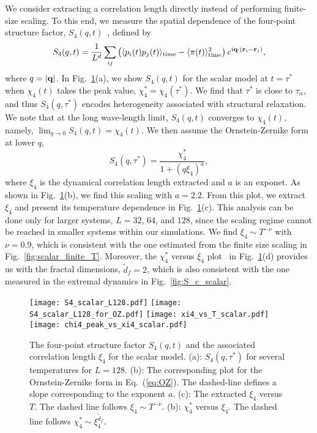\documentclass[pre,twocolumn,superscriptaddress,tightenlines,showpacs,longbibliography,floatfix,footinbib]{revtex4-1}
\begin{document}
We consider extracting a correlation length directly instead of performing finite-size scaling. 
To this end, we measure the spatial dependence of the four-point structure factor, $S_4(q, t)$~\cite{lavcevic2003spatially}, defined by
\begin{equation}
    S_4(q,t) = \frac{1}{L^d} \sum_{ij} \left( \langle p_i(t)p_j(t)\rangle_{\rm time} - \langle \pi(t) \rangle_{\rm time}^2 \right)e^{i{\bf q} \cdot ({\bf r}_i-{\bf r}_j)},
\end{equation}
where $q=|{\bf q}|$.
In Fig.~\ref{fig:S4}(a), we show $S_4(q,t)$ for the scalar model at $t=\tau^*$ when $\chi_4(t)$ takes the peak value, $\chi_4^*=\chi_4(\tau^*)$. We find that $\tau^*$ is close to $\tau_\alpha$, and thus $S_4(q,\tau^*)$ encodes heterogeneity associated with structural relaxation. 
We note that at the long wave-length limit, $S_4(q,t)$ converges to $\chi_4(t)$, namely, $\lim_{q \to 0} S_4(q,t) = \chi_4(t)$.
We then assume the Ornstein-Zernike
form at lower $q$, 
\begin{equation}
    S_4(q,\tau^*) = \frac{\chi_4^*}{1+(q\xi_4)^a},
    \label{eq:OZ}
\end{equation}
where $\xi_4$ is the dynamical correlation length extracted and $a$ is an exponet.
As shown in Fig.~\ref{fig:S4}(b), we find this scaling with $a=2.2$.
From this plot, we extract $\xi_4$ and present its temperature dependence in Fig.~\ref{fig:S4}(c).
This analysis can be done only for larger systems, $L=32$, $64$, and  $128$, since the scaling regime cannot be reached in smaller systems within our simulations.
We find $\xi_4 \sim T^{-\nu}$ with $\nu=0.9$, which is consistent with the one estimated from the finite size scaling in Fig.~\ref{fig:scalar_finite_T}. Moreover, the $\chi_4^*$ versus $\xi_4$ plot~\cite{flenner2014universal,kim2013multiple} in Fig.~\ref{fig:S4}(d) provides us with the fractal dimensions, $\tilde d_f=2$, which is also consistent with the one measured in the extremal dynamics in Fig.~\ref{fig:S_c_scalar}.


\begin{figure}
\centering
\texttt{[image: S4\_scalar\_L128.pdf]}
\texttt{[image: S4\_scalar\_L128\_for\_OZ.pdf]}
\texttt{[image: xi4\_vs\_T\_scalar.pdf]}
\texttt{[image: chi4\_peak\_vs\_xi4\_scalar.pdf]}
\caption{The four-point structure factor $S_4(q, t)$ and the associated correlation length $\xi_4$ for the scalar model.
(a): $S_4(q, \tau^*)$ for several temperatures for $L=128$. (b): The corresponding plot for the Ornstein-Zernike
form in Eq.~(\ref{eq:OZ}). The dashed-line defines a slope corresponding to the exponent $a$.
(c): The extracted $\xi_4$ versus $T$. The dashed line follows $\xi_4 \sim T^{-\nu}$.
(b): $\chi_4^*$ versus $\xi_4$. The dashed line follows $\chi_4^* \sim \xi_4^{\tilde d_f}$.}
\label{fig:S4}
\end{figure}
\end{document}
